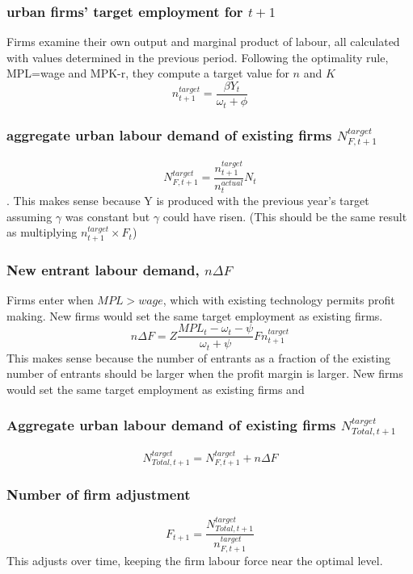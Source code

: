 {\color{red}
\subsubsection{urban firms' target employment for $t+1$} Firms examine their own output and marginal product of labour, all calculated with values determined in the previous period. Following the  optimality rule, MPL=wage and MPK-r, they compute a target value for $n$ and $K$
\[ n^{target}_{t+1}= \frac{\beta Y_{t}}{\omega_t + \phi} \]



\subsubsection{aggregate urban labour demand of existing firms $N_{F,t+1}^{target}$} 

\[N_{F,t+1}^{target} = \frac{n^{target}_{t+1}}{n^{actual}_{t}} N_t\].   
This makes sense because Y is produced with the previous year's target assuming  $\gamma$ was constant but  $\gamma$ could have risen. (This should be the same result as  multiplying $n^{target}_{t+1} \times F_{t} $)



\subsubsection{New entrant labour demand,  $n\Delta F$} Firms enter when $MPL > wage$, which with existing technology permits profit making. New firms would set the same target employment as existing firms. 
\[n\Delta F =Z\frac{MPL_t-\omega_t -\psi}{\omega_t +\psi}F n^{target}_{t+1}\]
This makes sense because the number of entrants as a fraction of the existing number of entrants should be larger when the profit margin is larger. New firms would set the same target employment as existing firms and 

\subsubsection{Aggregate urban labour demand of existing firms $N_{Total,t+1}^{target}$} 
\[N_{Total,t+1}^{target}= N_{F,t+1}^{target}+n\Delta F\]

\subsubsection{Number of firm adjustment} 
\[F_{t+1}=\frac{N_{Total,t+1}^{target}}{n^{target}_{F,t+1}}\] 
This adjusts over time, keeping the firm labour force near the optimal level. 
{
\color{blue}
}}
